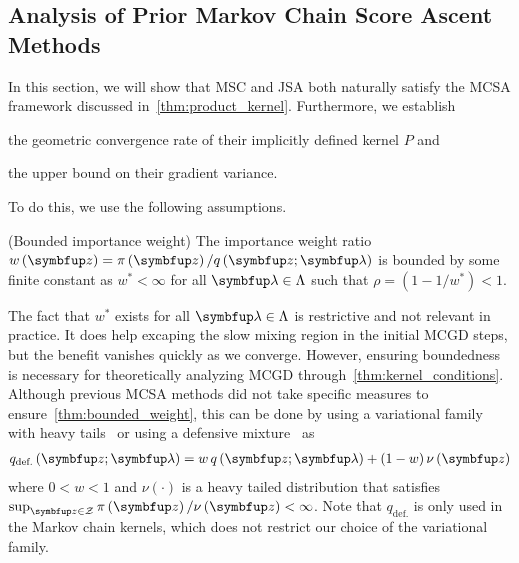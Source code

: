 
%
%


\vspace{-0.05in}
\subsection{Analysis of Prior Markov Chain Score Ascent Methods}\label{section:comparison}
\vspace{-0.05in}
In this section, we will show that MSC and JSA both naturally satisfy the MCSA framework discussed in~\cref{thm:product_kernel}.
Furthermore, we establish 
\begin{enumerate*}[label=\textbf{(\roman*)}]
  \item the geometric convergence rate of their implicitly defined kernel \(P\) and
  \item the upper bound on their gradient variance.
\end{enumerate*}
To do this, we use the following assumptions.
\begin{assumption}{(Bounded importance weight)}\label{thm:bounded_weight}
  The importance weight ratio \(w\left(\vz\right) = \pi\left(\vz\right) / q\left(\vz; \vlambda\right)\) is bounded by some finite constant as \(w^* < \infty\) for all \(\vlambda \in \Lambda\) such that \(\rho = \left(1 - 1/w^*\right) < 1\).
\end{assumption}
\vspace{-0.05in}
The fact that \(w^*\) exists for all \(\vlambda \in \Lambda\) is restrictive and not relevant in practice.
It does help excaping the slow mixing region in the initial MCGD steps, but the benefit vanishes quickly as we converge.
However, ensuring boundedness is necessary for theoretically analyzing MCGD through~\cref{thm:kernel_conditions}.
Although previous MCSA methods did not take specific measures to ensure~\cref{thm:bounded_weight}, this can be done by using a variational family with heavy tails~\citep{NEURIPS2018_25db67c5} or using a defensive mixture~\citep{hesterberg_weighted_1995, holden_adaptive_2009} as
\vspace{-0.05in}
\begin{align*}
  q_{\text{def.}}\left(\vz; \vlambda \right) = w \, q\left(\vz; \vlambda\right) + (1 - w) \, \nu\left(\vz\right)
\end{align*}
where \(0 < w < 1\) and \(\nu\left(\cdot\right)\) is a heavy tailed distribution that satisfies \(\sup_{\vz \in \mathcal{Z}} \pi\left(\vz\right) / \nu\left(\vz\right) < \infty\).
Note that \(q_{\text{def.}}\) is only used in the Markov chain kernels, which does not restrict our choice of the variational family.

